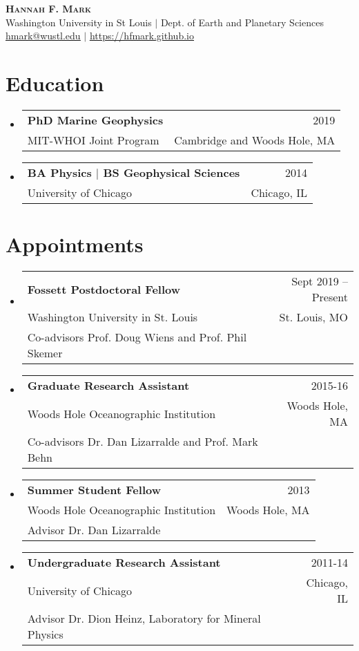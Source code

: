 \documentclass[letterpaper,11pt]{article}
\makeatletter
\newcommand{\resumeSubheading}[4]{
  \vspace{-2pt}\item
    \begin{tabular*}{0.97\textwidth}[t]{l@{\extracolsep{\fill}}r}
      \textbf{#1} & #2 \\
      \small#3 & \small #4 \\
    \end{tabular*}\vspace{-7pt}
}
\newcommand{\resumeAppt}[5]{
  \vspace{-2pt}\item
    \begin{tabular*}{0.97\textwidth}[t]{l@{\extracolsep{\fill}}r}
      \textbf{#1} & #2 \\
      \small#3 & \small #4 \\
      \small#5\\
    \end{tabular*}\vspace{-7pt}
}
\newcommand{\resumeSubHeadingListStart}{\begin{itemize}[leftmargin=0.15in, label={}]}
\newcommand{\resumeSubHeadingListEnd}{\end{itemize}}
\makeatother
\begin{document}
\begin{center}
    \textbf{\LARGE \scshape Hannah F. Mark} \\ \vspace{1pt}
    \small Washington University in St Louis $|$ Dept. of Earth and Planetary Sciences \\
    \small \href{mailto:hmark@wustl.edu}{\underline{hmark@wustl.edu}} $|$
    \href{https://hfmark.github.io}{\underline{https://hfmark.github.io}}
\end{center}


\section{Education}
  \resumeSubHeadingListStart
    \resumeSubheading
      {PhD Marine Geophysics}{2019}
      {MIT-WHOI Joint Program}{Cambridge and Woods Hole, MA}
    \resumeSubheading
      {BA Physics $|$ BS Geophysical Sciences}{2014}
      {University of Chicago}{Chicago, IL}
  \resumeSubHeadingListEnd


\section{Appointments}
  \resumeSubHeadingListStart

    \resumeAppt
      {Fossett Postdoctoral Fellow}{Sept 2019 -- Present}
      {Washington University in St. Louis}{St. Louis, MO}
      {Co-advisors Prof. Doug Wiens and Prof. Phil Skemer}

    \resumeAppt
      {Graduate Research Assistant}{2015-16}
      {Woods Hole Oceanographic Institution}{Woods Hole, MA}
      {Co-advisors Dr. Dan Lizarralde and Prof. Mark Behn}

    \resumeAppt
      {Summer Student Fellow}{2013}
      {Woods Hole Oceanographic Institution}{Woods Hole, MA}
      {Advisor Dr. Dan Lizarralde}

    \resumeAppt
      {Undergraduate Research Assistant}{2011-14}
      {University of Chicago}{Chicago, IL}
      {Advisor Dr. Dion Heinz, Laboratory for Mineral Physics}

  \resumeSubHeadingListEnd


\end{document}
